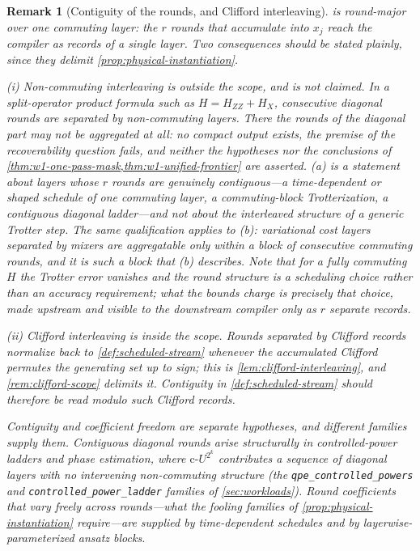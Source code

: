 \documentclass[a4paper,twocolumn,10pt,unpublished]{quantumarticle}
\newtheorem{remark}{Remark}
\begin{document}
\begin{remark}[Contiguity of the rounds, and Clifford interleaving]
\label{rem:round-contiguity}
 is round-major over \emph{one} commuting
layer: the $r$ rounds that accumulate into $x_j$ reach the compiler as
records of a single layer.  Two consequences should be stated plainly,
since they delimit \cref{prop:physical-instantiation}.

(i) \emph{Non-commuting interleaving is outside the scope, and is not
claimed.}  In a split-operator product formula such as
$H=H_{ZZ}+H_X$, consecutive diagonal rounds are separated by
non-commuting layers.  There the rounds of the diagonal part may not be
aggregated at all: no compact output exists, the premise of the
recoverability question fails, and neither the hypotheses nor the
conclusions of \cref{thm:w1-one-pass-mask,thm:w1-unified-frontier}
are asserted.  (a) is a statement
about layers whose $r$ rounds are genuinely contiguous---a
time-dependent or shaped schedule of one commuting layer, a
commuting-block Trotterization, a contiguous diagonal ladder---and not
about the interleaved structure of a generic Trotter step.  The same
qualification applies to (b): variational cost layers separated by
mixers are aggregatable only within a block of consecutive commuting
rounds, and it is such a block that (b) describes.  Note that for a
\emph{fully} commuting $H$ the Trotter error vanishes and the round
structure is a scheduling choice rather than an accuracy requirement;
what the bounds charge is precisely that choice, made upstream and
visible to the downstream compiler only as $r$ separate records.

(ii) \emph{Clifford interleaving is inside the scope.}  Rounds separated
by Clifford records normalize back to \cref{def:scheduled-stream}
whenever the accumulated Clifford permutes the generating set up to
sign; this is \cref{lem:clifford-interleaving}, and
\cref{rem:clifford-scope} delimits it.  Contiguity in
\cref{def:scheduled-stream} should therefore be read modulo such
Clifford records.

Contiguity and coefficient freedom are separate hypotheses, and
different families supply them.  Contiguous diagonal rounds arise
structurally in controlled-power ladders and phase estimation, where
$\mathrm{c}\text{-}U^{2^k}$ contributes a sequence of diagonal layers with
no intervening non-commuting structure (the
\texttt{qpe\_controlled\_powers} and \texttt{controlled\_power\_ladder}
families of \cref{sec:workloads}).  Round coefficients that vary freely
across rounds---what the fooling families of
\cref{prop:physical-instantiation} require---are supplied by
time-dependent schedules and by layerwise-parameterized ansatz blocks.
\end{remark}
\end{document}
